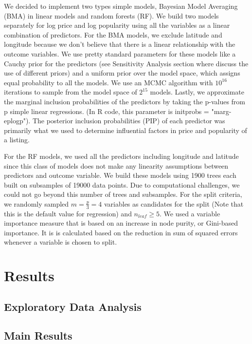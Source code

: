 \documentclass{article}
\begin{document}
We decided to implement two types simple models, Bayesian Model Averaging (BMA) in linear models and random forests (RF). We build two models separately for log price and log popularity using all the variables as a linear combination of predictors. For the BMA models, we exclude latitude and longitude because we don't believe that there is a linear relationship with the outcome variables. We use pretty standard parameters for these models like a Cauchy prior for the predictors (see Sensitivity Analysis section where discuss the use of different priors) and a uniform prior over the model space, which assigns equal probability to all the models. We use an MCMC algorithm with $10^{16}$ iterations to sample from the model space of $2^{15}$ models. Lastly, we approximate the marginal inclusion probabilities of the predictors by taking the p-values from p simple linear regressions. (In R code, this parameter is initprobs = "marg-eplogp"). The posterior inclusion probabilities (PIP) of each predictor was primarily what we used to determine influential factors in price and popularity of a listing. 

For the RF models, we used all the predictors including longitude and latitude since this class of models does not make any linearity assumptions between predictors and outcome variable. We build these models using 1900 trees each built on subsamples of 19000 data points. Due to computational challenges, we could not go beyond this number of trees and subsamples. For the split criteria, we randomly sampled $m = \frac{p}{3} = 4$ variables as candidates for the split (Note that this is the default value for regression) and $n_{leaf} \geq 5$. We used a variable importance measure that is based on an increase in node purity, or Gini-based importance. It is is calculated based on the reduction in sum of squared errors whenever a variable is chosen to split.

\section{Results}

\subsection{Exploratory Data Analysis} 

\subsection{Main Results} 
\end{document}
